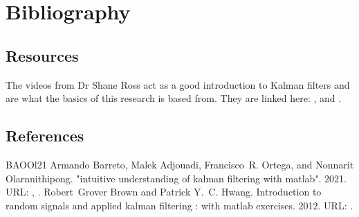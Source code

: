 \documentclass[letterpaper,10pt,english]{jupyterBook}
\begin{document}
\sphinxstepscope


\chapter{Bibliography}
\label{\detokenize{99Bibliography:bibliography}}\label{\detokenize{99Bibliography::doc}}

\section{Resources}
\label{\detokenize{99Bibliography:resources}}
\sphinxAtStartPar
The videos from Dr Shane Ross act as a good introduction to Kalman filters and are what the basics of this research is based from. They are linked here: ,  and .


\section{References}
\label{\detokenize{99Bibliography:references}}
\begin{sphinxthebibliography}{BAOOl21}
\sphinxAtStartPar
Armando Barreto, Malek Adjouadi, Francisco R. Ortega, and Nonnarit O\sphinxhyphen{}larnnithipong. "intuitive understanding of kalman filtering with matlab". 2021. URL: , .
\sphinxAtStartPar
Robert Grover Brown and Patrick Y. C. Hwang. Introduction to random signals and applied kalman filtering : with matlab exercises. 2012. URL: .
\end{sphinxthebibliography}







\renewcommand{\indexname}{Index}
\printindex
\end{document}
